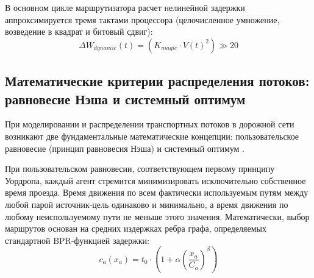 В основном цикле маршрутизатора расчет нелинейной задержки аппроксимируется тремя тактами процессора (целочисленное умножение, возведение в квадрат и битовый сдвиг):
\begin{equation}\label{eq:delta_w_dynamic}
    \Delta W_{dynamic}(t) = (K_{magic} \cdot V(t)^2) \gg 20
\end{equation}

\subsection{Математические критерии распределения потоков: равновесие Нэша и системный оптимум}
При моделировании и распределении транспортных потоков в дорожной сети возникают две фундаментальные математические концепции: пользовательское равновесие (принцип равновесия Нэша) и системный оптимум \cite{sheffi1985urban}. 

При пользовательском равновесии, соответствующем первому принципу Уордропа, каждый агент стремится минимизировать исключительно собственное время проезда. Время движения по всем фактически используемым путям между любой парой источник-цель одинаково и минимально, а время движения по любому неиспользуемому пути не меньше этого значения. Математически, выбор маршрутов основан на средних издержках ребра графа, определяемых стандартной BPR-функцией задержки:
\begin{equation}\label{eq:bpr_classic}
    c_a(x_a) = t_0 \cdot \left( 1 + \alpha \left(\frac{x_a}{C_a}\right)^\beta \right)
\end{equation}

